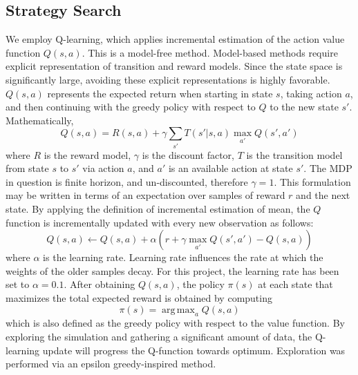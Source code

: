 \documentclass{article}
\DeclareMathOperator*{\argmax}{arg\,max}
\begin{document}
\subsection{Strategy Search} %
We employ Q-learning, which applies incremental estimation of the action value function $Q(s,a)$\cite{228book}. This is a model-free method. Model-based methods require explicit representation of transition and reward models. Since the state space is significantly large, avoiding these explicit representations is highly favorable. $Q(s,a)$ represents the expected return when starting in state $s$, taking action $a$, and then continuing with the greedy policy with respect to $Q$ to the new state $s'$. Mathematically,
\begin{equation}
    Q(s,a) = R(s,a) + \gamma \sum_{s'} T(s' \vert s,a) \max_{a'}Q(s', a')
\end{equation}
where $R$ is the reward model, $\gamma$ is the discount factor, $T$ is the transition model from state $s$ to $s'$ via action $a$, and $a'$ is an available action at state $s'$. The MDP in question is finite horizon, and un-discounted, therefore $\gamma = 1$. This formulation may be written in terms of an expectation over samples of reward $r$ and the next state. By applying the definition of incremental estimation of mean, the $Q$ function is incrementally updated with every new observation as follows:
\begin{equation}
    Q(s,a) \leftarrow Q(s,a) + \alpha \left( r+ \gamma \max_{a'}Q(s',a') - Q(s,a)\right)
\label{eqn:q_update}
\end{equation}
where $\alpha$ is the learning rate. Learning rate influences the rate at which the weights of the older samples decay. For this project, the learning rate has been set to $\alpha = 0.1$. After obtaining $Q(s,a)$, the policy $\pi(s)$ at each state that maximizes the total expected reward is obtained by computing
\begin{equation}
    \pi(s) = \argmax_{a} Q(s,a)
\label{eqn:policy}
\end{equation}
which is also defined as the greedy policy with respect to the value function. By exploring the simulation and gathering a significant amount of data, the Q-learning update will progress the Q-function towards optimum. Exploration was performed via an epsilon greedy-inspired method. 
\end{document}
